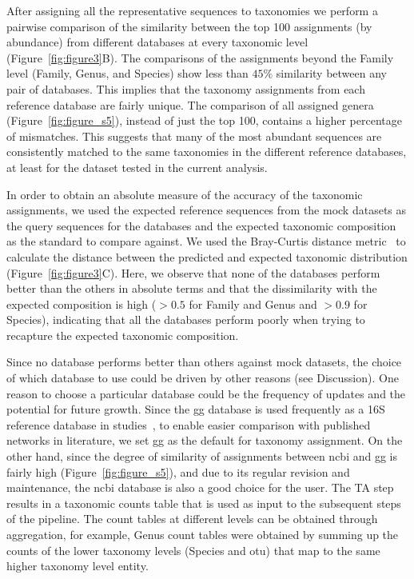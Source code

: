   After assigning all the representative sequences to taxonomies we perform a pairwise comparison of the similarity between the top 100 assignments (by abundance) from different databases at every taxonomic level (Figure~\ref{fig:figure3}B).
  The comparisons of the assignments beyond the Family level (Family, Genus, and Species) show less than $45\%$ similarity between any pair of databases.
  This implies that the taxonomy assignments from each reference database are fairly unique.
  The comparison of all assigned genera (Figure~\ref{fig:figure_s5}), instead of just the top 100, contains a higher percentage of mismatches.
  This suggests that many of the most abundant sequences are consistently matched to the same taxonomies in the different reference databases, at least for the dataset tested in the current analysis.

  In order to obtain an absolute measure of the accuracy of the taxonomic assignments, we used the expected reference sequences from the mock datasets as the query sequences for the databases and the expected taxonomic composition as the standard to compare against.
  We used the Bray-Curtis distance metric~\cite{virtanenSciPyFundamentalAlgorithms2020} to calculate the distance between the predicted and expected taxonomic distribution (Figure~\ref{fig:figure3}C).
  Here, we observe that none of the databases perform better than the others in absolute terms and that the dissimilarity with the expected composition is high ($>0.5$ for Family and Genus and $>0.9$ for Species), indicating that all the databases perform poorly when trying to recapture the expected taxonomic composition.

  Since no database performs better than others against mock datasets, the choice of which database to use could be driven by other reasons (see Discussion).
  One reason to choose a particular database could be the frequency of updates and the potential for future growth.
  Since the \ac{gg} database is used frequently as a 16S reference database in studies~\cite{Balvociute2017}, to enable easier comparison with published networks in literature, we set \ac{gg} as the default for taxonomy assignment.
  On the other hand, since the degree of similarity of assignments between \ac{ncbi} and \ac{gg} is fairly high (Figure~\ref{fig:figure_s5}), and due to its regular revision and maintenance, the \ac{ncbi} database is also a good choice for the user.
  The TA step results in a taxonomic counts table that is used as input to the subsequent steps of the pipeline.
  The count tables at different levels can be obtained through aggregation, for example, Genus count tables were obtained by summing up the counts of the lower taxonomy levels (Species and \ac{otu}) that map to the same higher taxonomy level entity.

